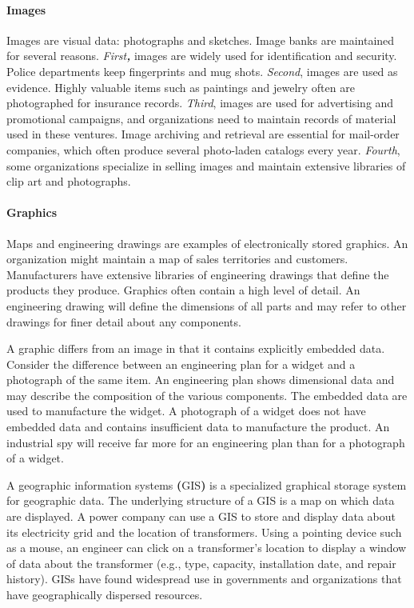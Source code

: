 \documentclass[
]{article}
\begin{document}
\hypertarget{images}{%
\paragraph*{Images}\label{images}}

Images are visual data: photographs and sketches. Image banks are
maintained for several reasons. \emph{First\textbf{,}} images are widely used for
identification and security. Police departments keep fingerprints and
mug shots. \emph{Second}, images are used as evidence. Highly valuable items
such as paintings and jewelry often are photographed for insurance
records. \emph{Third}, images are used for advertising and promotional
campaigns, and organizations need to maintain records of material used
in these ventures. Image archiving and retrieval are essential for
mail-order companies, which often produce several photo-laden catalogs
every year. \emph{Fourth}, some organizations specialize in selling images
and maintain extensive libraries of clip art and photographs.

\hypertarget{graphics}{%
\paragraph*{Graphics}\label{graphics}}

Maps and engineering drawings are examples of electronically stored
graphics. An organization might maintain a map of sales territories and
customers. Manufacturers have extensive libraries of engineering
drawings that define the products they produce. Graphics often contain a
high level of detail. An engineering drawing will define the dimensions
of all parts and may refer to other drawings for finer detail about any
components.

A graphic differs from an image in that it contains explicitly embedded
data. Consider the difference between an engineering plan for a widget
and a photograph of the same item. An engineering plan shows dimensional
data and may describe the composition of the various components. The
embedded data are used to manufacture the widget. A photograph of a
widget does not have embedded data and contains insufficient data to
manufacture the product. An industrial spy will receive far more for an
engineering plan than for a photograph of a widget.

A geographic information systems \textbf{(}GIS\textbf{)} is a specialized
graphical storage system for geographic data. The underlying structure
of a GIS is a map on which data are displayed. A power company can use a
GIS to store and display data about its electricity grid and the
location of transformers. Using a pointing device such as a mouse, an
engineer can click on a transformer's location to display a window of
data about the transformer (e.g., type, capacity, installation date, and
repair history). GISs have found widespread use in governments and
organizations that have geographically dispersed resources.
\end{document}
